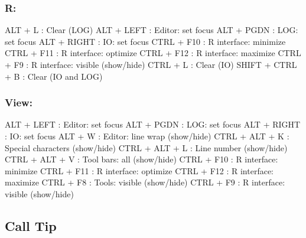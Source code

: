 \subsubsection{R:}

\vspace{-0.5cm}
\begin{Rtables}[caption={[R menu keyboard shortcuts]
    R menu keyboard shortcuts},
  label=menu:r]
  ALT  + L               : Clear (LOG)
  ALT  + LEFT            : Editor: set focus
  ALT  + PGDN            : LOG: set focus
  ALT  + RIGHT           : IO: set focus
  CTRL + F10             : R interface: minimize
  CTRL + F11             : R interface: optimize
  CTRL + F12             : R interface: maximize
  CTRL + F9              : R interface: visible (show/hide)
  CTRL + L               : Clear (IO)
  SHIFT + CTRL + B       : Clear (IO and LOG)
\end{Rtables}


\subsubsection{View:}

\vspace{-0.5cm}
\begin{Rtables}[caption={[View menu keyboard shortcuts]
    View menu keyboard shortcuts},
  label=menu:view]
  ALT  + LEFT             : Editor: set focus
  ALT  + PGDN             : LOG: set focus
  ALT  + RIGHT            : IO: set focus
  ALT  + W                : Editor: line wrap (show/hide)
  CTRL + ALT + K          : Special characters (show/hide)
  CTRL + ALT + L          : Line number (show/hide)
  CTRL + ALT + V          : Tool bars: all (show/hide)
  CTRL + F10              : R interface: minimize
  CTRL + F11              : R interface: optimize
  CTRL + F12              : R interface: maximize
  CTRL + F8               : Tools: visible (show/hide)
  CTRL + F9               : R interface: visible (show/hide)
\end{Rtables}


\hypertarget{basic_card_calltip}{}
\subsection{Call Tip}

